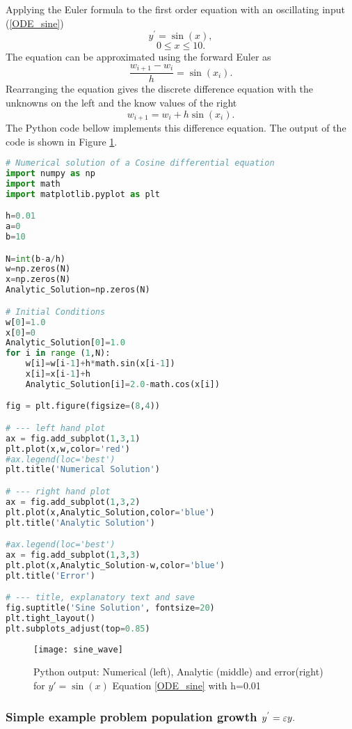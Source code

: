 \begin{example} Applying the Euler formula to the first order equation with an oscillating input
(\ref{ODE_sine})
\[ y^{'} = \sin(x), \]
\[0\leq x \leq 10. \]
The equation can be approximated using the forward Euler as 
\[\frac{w_{i+1}-w_i}{h}=\sin(x_i). \]
Rearranging the equation gives the discrete difference equation with the unknowns on the left and the know values of the right
\[w_{i+1}=w_i+h\sin(x_i). \]
The Python code bellow implements this difference equation. The output of the code is shown in Figure \ref{Sine wave ODE}.


\begin{lstlisting}[language=Python, caption=Python Numerical and Analytical Solution of Eqn \ref{ODE_sine} ]
# Numerical solution of a Cosine differential equation
import numpy as np
import math 
import matplotlib.pyplot as plt

h=0.01
a=0
b=10

N=int(b-a/h)
w=np.zeros(N)
x=np.zeros(N)
Analytic_Solution=np.zeros(N)

# Initial Conditions
w[0]=1.0
x[0]=0
Analytic_Solution[0]=1.0
for i in range (1,N):
    w[i]=w[i-1]+h*math.sin(x[i-1])
    x[i]=x[i-1]+h
    Analytic_Solution[i]=2.0-math.cos(x[i])

fig = plt.figure(figsize=(8,4))

# --- left hand plot
ax = fig.add_subplot(1,3,1)
plt.plot(x,w,color='red')
#ax.legend(loc='best')
plt.title('Numerical Solution')

# --- right hand plot
ax = fig.add_subplot(1,3,2)
plt.plot(x,Analytic_Solution,color='blue')
plt.title('Analytic Solution')

#ax.legend(loc='best')
ax = fig.add_subplot(1,3,3)
plt.plot(x,Analytic_Solution-w,color='blue')
plt.title('Error')

# --- title, explanatory text and save
fig.suptitle('Sine Solution', fontsize=20)
plt.tight_layout()
plt.subplots_adjust(top=0.85)
\end{lstlisting}

\end{example}

\begin{figure}[h]
\centering
\texttt{[image: sine\_wave]}
\caption{Python output: Numerical (left), Analytic (middle) and error(right) for $y'=\sin(x)$ Equation \ref{ODE_sine} with h=0.01}
\label{Sine wave ODE}
\end{figure}

\subsubsection{Simple example problem population growth $y^{'}=\varepsilon y. $ }

